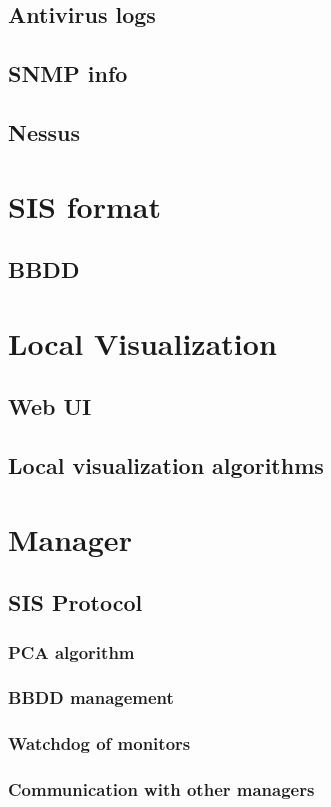 \documentclass[a4paper,12pt]{article}
\begin{document}
\subsection{Antivirus logs}

\subsection{SNMP info}

\subsection{Nessus}

\section{SIS format}

\subsection{BBDD}

\section{Local Visualization}

\subsection{Web UI}

\subsection{Local visualization algorithms}

\section{Manager}

\subsection{SIS Protocol}

\subsubsection{PCA algorithm}

\subsubsection{BBDD management}

\subsubsection{Watchdog of monitors}

\subsubsection{Communication with other managers}
\end{document}
